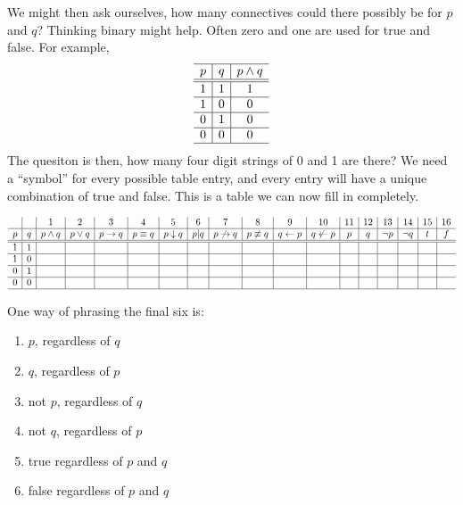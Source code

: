 \begin{problem}
We might then ask ourselves, how many connectives could there possibly be for $p$ and $q$?  Thinking binary might help.  Often zero and one are used for true and false.  For example,
 $$ \begin{array}{c|c|c}
  \hline  
  p & q & p\land q\\
  \hline
  \hline
1& 1& 1\\
  \hline
1& 0 & 0\\
  \hline
 0 &  1 & 0\\
  \hline
 0& 0 &  0\\
  \hline
    \end{array}$$
The quesiton is then, how many four digit strings of 0 and 1 are there?  We need a ``symbol'' for every possible table entry, and every entry will have a unique combination of true and false. This is a table we can now fill in completely.

$$\begin{array}{c|c|c|c|c|c|c|c|c|c|c|c|c|c|c|c|c|c}
 && 1 & 2 & 3 & 4 & 5 & 6 & 7 & 8 & 9 & 10 & 11 & 12 & 13  & 14 & 15 & 16\\
  \hline  
p & q	 & p\land q & p\lor q	& p\rightarrow q & 	p\equiv q	&  p\downarrow q & p|q &  	p\not\rightarrow q & 	p\not\equiv q &	q\leftarrow p &q\not\leftarrow p 	&p&q&\neg p	&\neg q	&t	&f	\\
\hline
\hline
1 &1 	 &	 &	 &	 &	 &	 &	 &	 &	&	&	&&&	&	&	&\\ 
\hline 
1&0 	 &	 &	 &	 &	 &	 &	 &	 &	&	&	&&&	&	&	&\\ 
\hline
0  &1 & 	 &	 &	 &	 &	 &	 &	 &	&	&	&&&	&	&	&\\ 
\hline
0  &	0  &	 &	 &	 &	 &	 &	 &	 &	&	&	&&&	&	&	&\\ 
\hline
\end{array}$$

One way of phrasing the final six is:
\begin{enumerate}
\addtocounter{enumi}{10}
\item $p$, regardless of $q$
\item $q$, regardless of $p$
\item not $p$, regardless of $q$
\item not $q$, regardless of $p$
\item true  regardless of $p$ and $q$
\item false  regardless of $p$ and $q$
\end{enumerate}
\end{problem}

